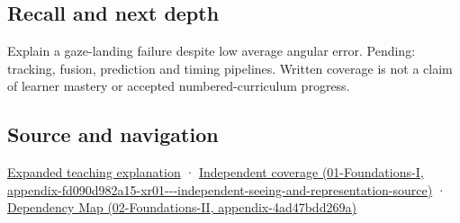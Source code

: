 \subsection{Recall and next depth}\label{appendix-a6f2c4fe1996-recall-and-next-depth}

Explain a gaze-landing failure despite low average angular error. Pending: tracking, fusion, prediction and timing pipelines. Written coverage is not a claim of learner mastery or accepted numbered-curriculum progress.

\subsection{Source and navigation}\label{appendix-a6f2c4fe1996-source-and-navigation}

\hyperref[04-visual-computing-ii-ch042-a-gaze-sample-needs-a-time-as-well-as-a-direction]{Expanded teaching explanation} · \href{../01-Foundations-I/main.pdf\#nameddest=appendix-fd090d982a15-xr01---independent-seeing-and-representation-source}{Independent coverage (01-Foundations-I, appendix-fd090d982a15-xr01-\/-\/-independent-seeing-and-representation-source)} · \href{../02-Foundations-II/main.pdf\#nameddest=appendix-4ad47bdd269a}{Dependency Map (02-Foundations-II, appendix-4ad47bdd269a)}
